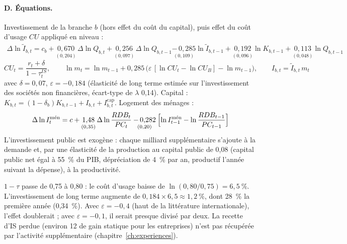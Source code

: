 \paragraph{D. Équations.} Investissement de la branche $b$ (hors effet du coût du capital), puis effet du coût d'usage
$CU$ appliqué en niveau :
\begin{multline}
\Delta\ln \tilde I_{b,t} = c_b + \underset{(0{,}204)}{0{,}670}\,\Delta\ln Q_{b,t} + \underset{(0{,}097)}{0{,}256}\,\Delta\ln Q_{b,t-1}
\underset{(0{,}109)}{-\,0{,}285}\ln \tilde I_{b,t-1} + \underset{(0{,}096)}{0{,}192}\ln K_{b,t-1} + \underset{(0{,}048)}{0{,}113}\ln Q_{b,t-1}
\end{multline}
\begin{equation}
CU_t = \frac{r_t + \delta}{1-\tau^{IS}_t},\qquad \ln m_t = \ln m_{t-1} + 0{,}285\,\bigl(\varepsilon\,[\ln CU_t - \ln CU_B] - \ln m_{t-1}\bigr),\qquad I_{b,t} = \tilde I_{b,t}\, m_t
\end{equation}
avec $\delta = 0{,}07$, $\varepsilon = -0{,}184$ (élasticité de long terme estimée sur l'investissement des sociétés
non financières, écart-type de $\lambda$ 0,14). Capital : $K_{b,t} = (1-\delta_b)K_{b,t-1} + I_{b,t} + I^{\text{cap}}_{b,t}$.
Logement des ménages :
\begin{equation}
\Delta\ln I^{\text{mén}}_t = c + \underset{(0{,}35)}{1{,}48}\,\Delta\ln\frac{RDB_t}{PC_t} \underset{(0{,}20)}{-\,0{,}282}\Bigl[\ln I^{\text{mén}}_{t-1}-\ln\frac{RDB_{t-1}}{PC_{t-1}}\Bigr]
\end{equation}
L'investissement public est exogène : chaque milliard supplémentaire s'ajoute à la demande et, par une élasticité de
la production au capital public de 0,08 (capital public net égal à 55~\% du PIB, dépréciation de 4~\% par an,
productif l'année suivant la dépense), à la productivité.

\begin{exemple}
$1-\tau$ passe de 0,75 à 0,80 : le coût d'usage baisse de $\ln(0{,}80/0{,}75) = 6{,}5~\%$. L'investissement de long
terme augmente de $0{,}184 \times 6{,}5 \approx 1{,}2~\%$, dont 28~\% la première année (0,34~\%). Avec
$\varepsilon = -0{,}4$ (haut de la littérature internationale), l'effet doublerait ; avec $\varepsilon = -0{,}1$, il
serait presque divisé par deux. La recette d'IS perdue (environ 12\md{} de gain statique pour les entreprises) n'est
pas récupérée par l'activité supplémentaire (chapitre~\ref{ch:experiences}).
\end{exemple}

